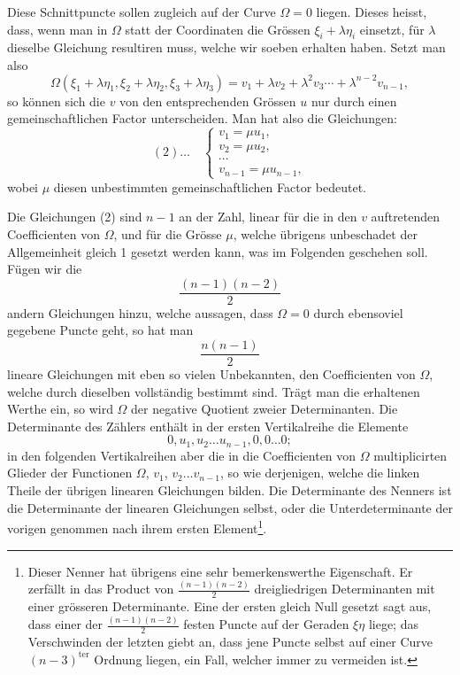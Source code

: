 \documentclass[10pt]{article}
\begin{document}
Diese Schnittpuncte sollen zugleich auf der Curve $\Omega=0$ liegen. Dieses heisst, dass, wenn man in $\Omega$ statt der Coordinaten die Grössen $\xi_i+\lambda\eta_i$ einsetzt, für $\lambda$ dieselbe Gleichung resultiren muss, welche wir soeben erhalten haben. Setzt man also
\[
\Omega(\xi_1+\lambda\eta_1,\xi_2+\lambda\eta_2,\xi_3+\lambda\eta_3)
=v_1+\lambda v_2+\lambda^2v_3\cdots+\lambda^{n-2}v_{n-1},
\]
so können sich die $v$ von den entsprechenden Grössen $u$ nur durch einen gemeinschaftlichen Factor unterscheiden. Man hat also die Gleichungen:
\[
(2)\ldots\quad
\begin{cases}
 v_1=\mu u_1,\\
 v_2=\mu u_2,\\
 \cdots\\
 v_{n-1}=\mu u_{n-1},
\end{cases}
\]
wobei $\mu$ diesen unbestimmten gemeinschaftlichen Factor bedeutet.

Die Gleichungen (2) sind $n-1$ an der Zahl, linear für die in den $v$ auftretenden Coefficienten von $\Omega$, und für die Grösse $\mu$, welche übrigens unbeschadet der Allgemeinheit gleich 1 gesetzt werden kann, was im Folgenden geschehen soll. Fügen wir die
\[
\frac{(n-1)(n-2)}{2}
\]
andern Gleichungen hinzu, welche aussagen, dass $\Omega=0$ durch ebensoviel gegebene Puncte geht, so hat man
\[
\frac{n(n-1)}{2}
\]
lineare Gleichungen mit eben so vielen Unbekannten, den Coefficienten von $\Omega$, welche durch dieselben vollständig bestimmt sind. Trägt man die erhaltenen Werthe ein, so wird $\Omega$ der negative Quotient zweier Determinanten. Die Determinante des Zählers enthält in der ersten Vertikalreihe die Elemente
\[
0, u_1, u_2\ldots u_{n-1}, 0,0\ldots0;
\]
in den folgenden Vertikalreihen aber die in die Coefficienten von $\Omega$ multiplicirten Glieder der Functionen $\Omega$, $v_1$, $v_2\ldots v_{n-1}$, so wie derjenigen, welche die linken Theile der übrigen linearen Gleichungen bilden. Die Determinante des Nenners ist die Determinante der linearen Gleichungen selbst, oder die Unterdeterminante der vorigen genommen nach ihrem ersten Element\footnote{Dieser Nenner hat übrigens eine sehr bemerkenswerthe Eigenschaft. Er zerfällt in das Product von $\frac{(n-1)(n-2)}{2}$ dreigliedrigen Determinanten mit einer grösseren Determinante. Eine der ersten gleich Null gesetzt sagt aus, dass einer der $\frac{(n-1)(n-2)}{2}$ festen Puncte auf der Geraden $\xi\eta$ liege; das Verschwinden der letzten giebt an, dass jene Puncte selbst auf einer Curve $(n-3)^{\mathrm{ter}}$ Ordnung liegen, ein Fall, welcher immer zu vermeiden ist.}.
\end{document}
